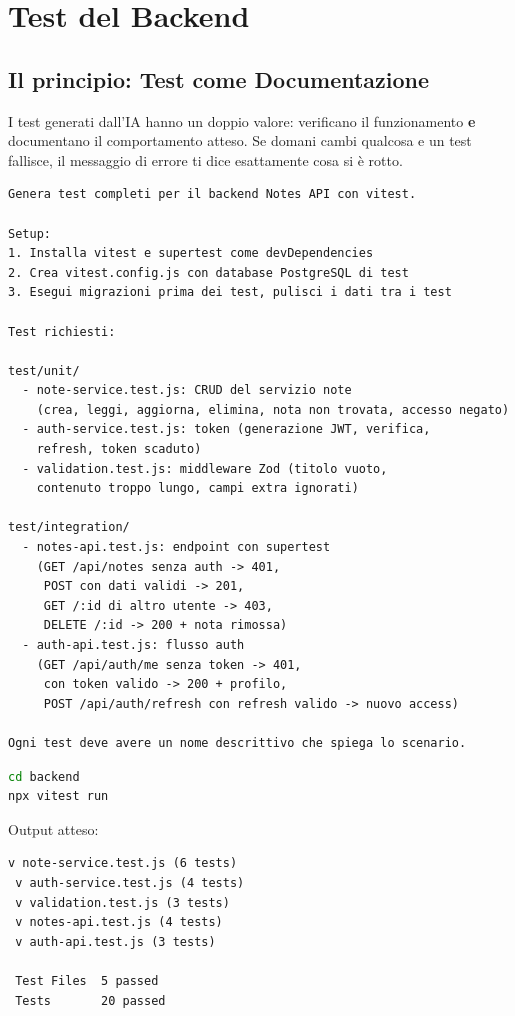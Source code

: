 \section{Test del Backend}

\subsection{Il principio: Test come Documentazione}

I test generati dall'IA hanno un doppio valore: verificano il funzionamento \textbf{e} documentano il comportamento atteso. Se domani cambi qualcosa e un test fallisce, il messaggio di errore ti dice esattamente cosa si è rotto.

\begin{praticabox}[title={Pratica --- Genera i test del backend}]
\begin{lstlisting}[language={}]
Genera test completi per il backend Notes API con vitest.

Setup:
1. Installa vitest e supertest come devDependencies
2. Crea vitest.config.js con database PostgreSQL di test
3. Esegui migrazioni prima dei test, pulisci i dati tra i test

Test richiesti:

test/unit/
  - note-service.test.js: CRUD del servizio note
    (crea, leggi, aggiorna, elimina, nota non trovata, accesso negato)
  - auth-service.test.js: token (generazione JWT, verifica,
    refresh, token scaduto)
  - validation.test.js: middleware Zod (titolo vuoto,
    contenuto troppo lungo, campi extra ignorati)

test/integration/
  - notes-api.test.js: endpoint con supertest
    (GET /api/notes senza auth -> 401,
     POST con dati validi -> 201,
     GET /:id di altro utente -> 403,
     DELETE /:id -> 200 + nota rimossa)
  - auth-api.test.js: flusso auth
    (GET /api/auth/me senza token -> 401,
     con token valido -> 200 + profilo,
     POST /api/auth/refresh con refresh valido -> nuovo access)

Ogni test deve avere un nome descrittivo che spiega lo scenario.
\end{lstlisting}
\end{praticabox}

\begin{lstlisting}[language=bash,title={Esegui i test}]
cd backend
npx vitest run
\end{lstlisting}

Output atteso:
\begin{lstlisting}[language={}]
 v note-service.test.js (6 tests)
 v auth-service.test.js (4 tests)
 v validation.test.js (3 tests)
 v notes-api.test.js (4 tests)
 v auth-api.test.js (3 tests)

 Test Files  5 passed
 Tests       20 passed
\end{lstlisting}

